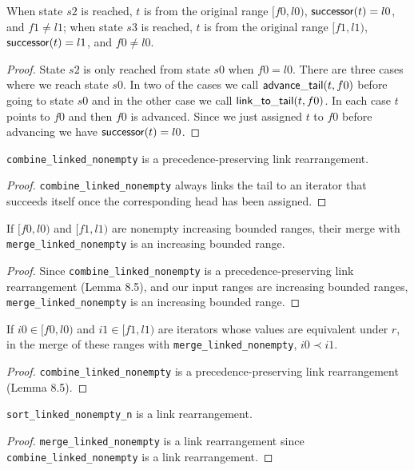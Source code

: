 \begin{lemma}
	When state $s2$ is reached, $t$ is from the original range $[f0, l0)$, $\mathsf{successor}(t) = l0$, and
	$f1 \neq l1$; when state $s3$ is reached, $t$ is from the original range $[f1, l1)$,
	$\mathsf{successor}(t) = l1$, and $f0 \neq l0$.
\end{lemma}

\begin{proof}
	State $s2$ is only reached from state $s0$ when $f0 = l0$. There are three cases where we reach state
	$s0$. In two of the cases we call $\mathsf{advance\_tail}(t, f0)$ before going to state $s0$ and in the other
	case we call $\mathsf{link\_to\_tail}(t, f0)$. In each case $t$ points to $f0$ and then $f0$ is advanced.
	Since we just assigned $t$ to $f0$ before advancing we have $\mathsf{successor}(t) = l0$.
\end{proof}

\begin{lemma}
	\verb|combine_linked_nonempty| is a precedence-preserving link rearrangement.
\end{lemma}

\begin{proof}
	\verb|combine_linked_nonempty| always links the tail to an iterator that succeeds itself once the
	corresponding head has been assigned.
\end{proof}

\begin{lemma}
	If $[f0, l0)$ and $[f1, l1)$ are nonempty increasing bounded ranges, their merge with
	\verb|merge_linked_nonempty| is an increasing bounded range.
\end{lemma}

\begin{proof}
	Since \verb|combine_linked_nonempty| is a precedence-preserving link rearrangement (Lemma 8.5), and
	our input ranges are increasing bounded ranges, \verb|merge_linked_nonempty| is an increasing bounded
	range.
\end{proof}

\begin{lemma}
	If $i0 \in [f0, l0)$ and $i1 \in [f1, l1)$ are iterators whose values are equivalent under $r$, in the
	merge of these ranges with \verb|merge_linked_nonempty|, $i0 \prec i1$.
\end{lemma}

\begin{proof}
	\verb|combine_linked_nonempty| is a precedence-preserving link rearrangement (Lemma 8.5).
\end{proof}

\begin{lemma}
	\verb|sort_linked_nonempty_n| is a link rearrangement.
\end{lemma}

\begin{proof}
	\verb|merge_linked_nonempty| is a link rearrangement since \verb|combine_linked_nonempty| is a link
	rearrangement.
\end{proof}
